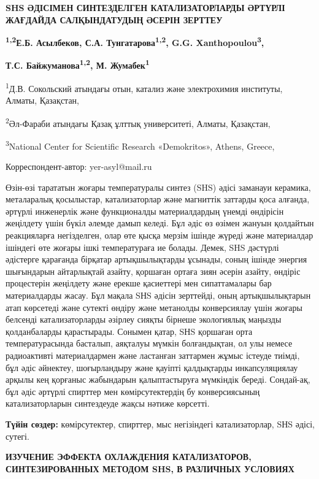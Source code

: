 {\bfseries SHS ӘДІСІМЕН СИНТЕЗДЕЛГЕН КАТАЛИЗАТОРЛАРДЫ ӘРТҮРЛІ ЖАҒДАЙДА
САЛҚЫНДАТУДЫҢ ӘСЕРІН ЗЕРТТЕУ}

{\bfseries \textsuperscript{1,2}Е.Б. Асылбеков, С.А.
Тунгатарова\textsuperscript{1,2}, G.G. Xanthopoulou\textsuperscript{3},}

{\bfseries Т.С. Байжуманова\textsuperscript{1,2}, М.
Жумабек\textsuperscript{1}}

\textsuperscript{1}Д.В. Сокольский атындағы отын, катализ және
электрохимия институты, Алматы, Қазақстан,

\textsuperscript{2}Әл-Фараби атындағы Қазақ ұлттық университеті, Алматы,
Қазақстан,

\textsuperscript{3}National Center for Scientific Research «Demokritos»,
Athens, Greece,

Корреспондент-автор: yer-asyl@mail.ru

Өзін-өзі тарататын жоғары температуралы синтез (SHS) әдісі заманауи
керамика, металаралық қосылыстар, катализаторлар және магниттік заттарды
қоса алғанда, әртүрлі инженерлік және функционалды материалдардың үнемді
өндірісін жеңілдету үшін бүкіл әлемде дамып келеді. Бұл әдіс өз өзімен
жануын қолдайтын реакцияларға негізделген, олар өте қысқа мерзім ішінде
жүреді және материалдар ішіндегі өте жоғары ішкі температураға ие
болады. Демек, SHS дәстүрлі әдістерге қарағанда бірқатар артықшылықтарды
ұсынады, соның ішінде энергия шығындарын айтарлықтай азайту, қоршаған
ортаға зиян әсерін азайту, өндіріс процестерін жеңілдету және ерекше
қасиеттері мен сипаттамалары бар материалдарды жасау. Бұл мақала SНS
әдісін зерттейді, оның артықшылықтарын атап көрсетеді және сутекті
өндіру және метанолды конверсиялау үшін жоғары белсенді катализаторларды
әзірлеу сияқты бірнеше экологиялық маңызды қолданбаларды қарастырады.
Сонымен қатар, SНS қоршаған орта температурасында басталып, аяқталуы
мүмкін болғандықтан, ол улы немесе радиоактивті материалдармен және
ластанған заттармен жұмыс істеуде тиімді, бұл әдіс әйнектеу,
шоғырландыру және қауіпті қалдықтарды инкапсуляциялау арқылы кең
қорғаныс жабындарын қалыптастыруға мүмкіндік береді. Сондай-ақ, бұл әдіс
әртүрлі спирттер мен көмірсутектердің бу конверсиясының катализаторларын
синтездеуде жақсы нәтиже көрсетті.

{\bfseries Түйін сөздер:} көмірсутектер, спирттер, мыс негізіндегі
катализаторлар, SНS әдісі, сутегі.

{\bfseries ИЗУЧЕНИЕ ЭФФЕКТА ОХЛАЖДЕНИЯ КАТАЛИЗАТОРОВ, СИНТЕЗИРОВАННЫХ
МЕТОДОМ SHS, В РАЗЛИЧНЫХ УСЛОВИЯХ}

